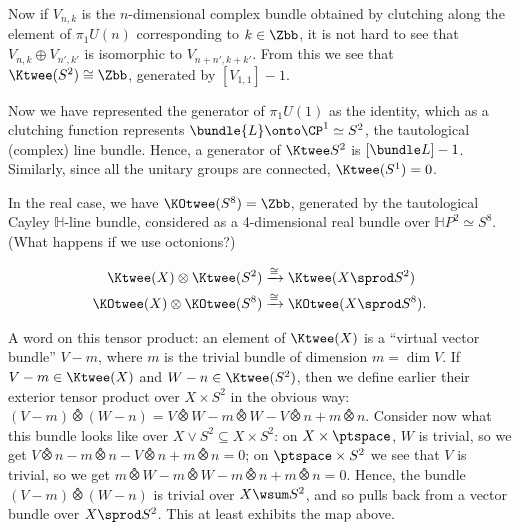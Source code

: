 Now if $V_{n,k}$ is the $n$-dimensional complex bundle obtained by clutching along the element of $\pi_1 U(n)$ corresponding to $k\in\Zbb$, it is not hard to see that $V_{n,k}\oplus V_{n',k'}$ is isomorphic to $V_{n+n',k+k'}$. From this we see that $\Ktwee(S^2) \cong \Zbb$, generated by $[V_{1,1}]-1$.

Now we have represented the generator of $\pi_1 U(1)$ as the identity, which as a clutching function represents $\bundle{L} \onto \CP^1 \simeq S^2$, the tautological (complex) line bundle.  Hence, a generator of $\Ktwee S^2$ is $[\bundle L] - 1$.  Similarly, since all the unitary groups are connected, $\Ktwee(S^1) = 0$.

\begin{fact}
In the real case, we have $\KOtwee(S^8) = \Zbb$, generated by the tautological Cayley $\mathbb{H}$-line bundle, considered as a 4-dimensional real bundle over $\mathbb{H}P^2 \simeq S^8$. (What happens if we use octonions?) %
\end{fact}

\begin{thm}
\begin{align*}
\Ktwee (X) \otimes \Ktwee (S^2) & \xrightarrow{\cong} \Ktwee(X \sprod S^2) \\
\KOtwee (X) \otimes \KOtwee (S^8) & \xrightarrow{\cong} \KOtwee(X \sprod S^8).
\end{align*}
\end{thm}

A word on this tensor product: an element of $\Ktwee (X)$ is a ``virtual vector bundle'' $V - m$, where $m$ is the trivial bundle of dimension $m = \dim V$.  If $V - m \in \Ktwee(X)$ and $W - n \in \Ktwee(S^2)$, then we define earlier their exterior tensor product over $X \times S^2$ in the obvious way: $(V - m)\otimeshat(W - n) = V \otimeshat W - m \otimeshat W - V \otimeshat n + m \otimeshat n$.  Consider now what this bundle looks like over $X \vee S^2 \subseteq X \times S^2$: on $X \times \ptspace$, $W$ is trivial, so we get $V \otimeshat n - m \otimeshat n - V \otimeshat n + m \otimeshat n = 0$; on $\ptspace \times S^2$ we see that $V$ is trivial, so we get $m \otimeshat W - m \otimeshat W - m \otimeshat n + m \otimeshat n = 0$.  Hence, the bundle $(V - m) \otimeshat (W - n)$ is trivial over $X \wsum S^2$, and so pulls back from a vector bundle over $X \sprod S^2$.  This at least exhibits the map above.

